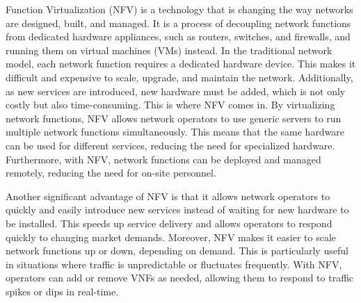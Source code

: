 \documentclass[journal]{IEEEtran}
\begin{document}
 Function Virtualization (NFV) is a technology that is changing the way networks are designed, built, and managed. It is a process of decoupling network functions from dedicated hardware appliances, such as routers, switches, and firewalls, and running them on virtual machines (VMs) instead. 
In the traditional network model, each network function requires a dedicated hardware device. This makes it difficult and expensive to scale, upgrade, and maintain the network. Additionally, as new services are introduced, new hardware must be added, which is not only costly but also time-consuming. This is where NFV comes in.
By virtualizing network functions, NFV allows network operators to use generic servers to run multiple network functions simultaneously. This means that the same hardware can be used for different services, reducing the need for specialized hardware. %
Furthermore, with NFV, network functions can be deployed and managed remotely, reducing the need for on-site personnel.

Another significant advantage of NFV is that it allows network operators to quickly and easily introduce new services instead of waiting for new hardware to be installed.
This speeds up service delivery and allows operators to respond quickly to changing market demands.
Moreover, NFV makes it easier to scale network functions up or down, depending on demand. This is particularly useful in situations where traffic is unpredictable or fluctuates frequently. With NFV, operators can add or remove VNFs as needed, allowing them to respond to traffic spikes or dips in real-time.
\end{document}
